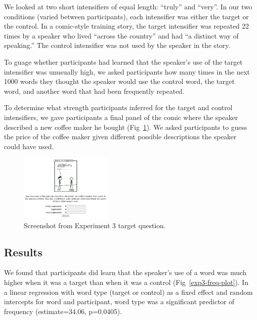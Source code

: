 \documentclass[10pt,letterpaper]{article}
\begin{document}
We looked at two short intensifiers of equal length: ``truly'' and ``very''. In our two conditions (varied between participants), each intensifier was either the target or the control. In a comic-style training story, the target intensifier was repeated 22 times by a speaker who lived ``across the country'' and had ``a distinct way of speaking.'' The control intensifier was not used by the speaker in the story.

To guage whether participants had learned that the speaker's use of the target intensifier was unusually high, we asked participants how many times in the next 1000 words they thought the speaker would use the control word, the target word, and another word that had been frequently repeated.

To determine what strength participants inferred for the target and control intensifiers, we gave participants a final panel of the comic where the speaker described a new coffee maker he bought (Fig~\ref{exp3-q}). We asked participants to guess the price of the coffee maker given different possible descriptions the speaker could have used.

\begin{figure}[ht]
\begin{center}
\includegraphics[width=0.4\textwidth]{analysis_files_for_writeup/images/exp3-q.png}
\end{center}
\caption{Screenshot from Experiment 3 target question.} 
\label{exp3-q}
\end{figure}

\subsection{Results}

We found that participants did learn that the speaker's use of a word was much higher when it was a target than when it was a control (Fig~\ref{exp3-freq-plot}). In a linear regression with word type (target or control) as a fixed effect and random intercepts for word and participant, word type was a significant predictor of frequency (estimate=34.06, p=0.0405).
\end{document}
